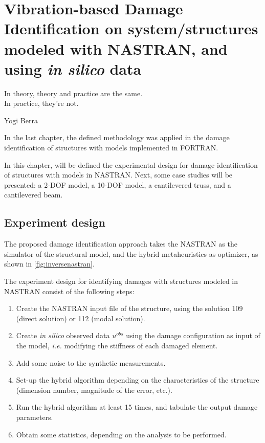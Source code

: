 \chapter{Vibration-based Damage Identification on system/structures modeled with NASTRAN, and using \textit{in silico} data}
\label{chp:8}
\epigraph{In theory, theory and practice are the same. \\In practice, they’re not.}{Yogi Berra}

\lstset{language=NASTRAN}
\lstset{basicstyle=\scriptsize\ttfamily,breaklines=true}

In the last chapter, the defined methodology was applied in the damage identification of structures with models implemented in FORTRAN.

In this chapter, will be defined the experimental design for damage identification of structures with models in NASTRAN. Next, some case studies will be presented: a 2-DOF model, a 10-DOF model, a cantilevered truss, and a cantilevered beam.

\section{Experiment design}

The proposed damage identification approach takes the NASTRAN as the simulator of the structural model, and the hybrid metaheuristics as optimizer, as shown in \autoref{fig:inversenastran}.

The experiment design for identifying damages with structures modeled in NASTRAN consist of the following steps:

\begin{enumerate}[label=(\arabic*)]
    \item Create the NASTRAN input file of the structure, using the solution 109 (direct solution) or 112 (modal solution).
    \item Create \textit{in silico} observed data $u^{obs}$ using the damage configuration as input of the model, \textit{i.e.} modifying the stiffness of each damaged element.
    \item Add some noise to the synthetic measurements.
    \item Set-up the hybrid algorithm depending on the characteristics of the structure (dimension number, magnitude of the error, etc.).
    \item Run the hybrid algorithm at least 15 times, and tabulate the output damage parameters.
    \item Obtain some statistics, depending on the analysis to be performed.
\end{enumerate}


